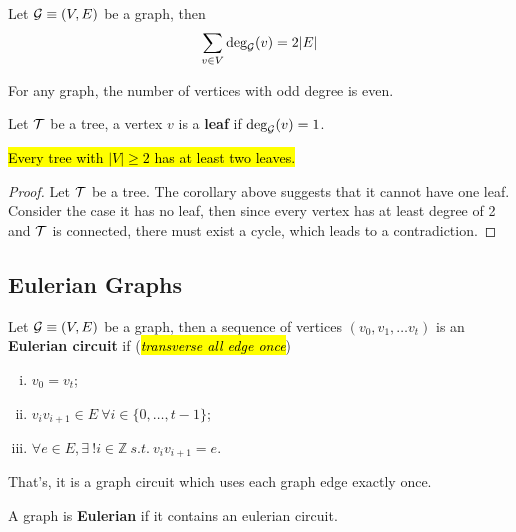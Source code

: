 \documentclass{article}
\def\Z{{\mathbb Z}}
\begin{document}
		\begin{theorem}
			Let $\mathcal{{G}} \equiv (V, E)$ be a graph, then
			\begin{equation}
				\sum_{v \in V}\text{{deg}}_{\mathcal{{G}}}(v) = 2 |E|
			\end{equation}
		\end{theorem}
		
		\begin{corollary}
			For any graph, the number of vertices with odd degree is even.
		\end{corollary}
		
		\begin{definition}
			Let $\mathcal{{T}}$ be a tree, a vertex $v$ is a \textbf{leaf} if $\text{{deg}}_{\mathcal{{G}}}(v)=1$.
		\end{definition}
		
		\begin{theorem}
			\hl{Every tree with $|V| \geq 2$ has at least two leaves.}
			\begin{proof}
				Let $\mathcal{{T}}$ be a tree. The corollary above suggests that it cannot have one leaf. Consider the case it has no leaf, then since every vertex has at least degree of 2 and $\mathcal{{T}}$ is connected, there must exist a cycle, which leads to a contradiction.
			\end{proof}
		\end{theorem}
		
		\subsection{Eulerian Graphs}
			\begin{definition}
				Let $\mathcal{{G}} \equiv (V, E)$ be a graph, then a sequence of vertices $(v_0,v_1,\dots v_t)$ is an \textbf{Eulerian circuit} if (\hl{\emph{transverse all edge once}})
				\begin{enumerate}[(i)]
					\item $v_0 = v_t$;
					\item $v_i v_{i+1} \in E\ \forall i \in \{0, \dots, t-1\}$;
					\item $\forall e \in E, \exists\ ! i \in \Z\ s.t.\ v_i v_{i+1} = e$.
				\end{enumerate}
				That's, it is a graph circuit which uses each graph edge exactly once.
			\end{definition}
			
			\begin{definition}
				A graph is \textbf{Eulerian} if it contains an eulerian circuit.
			\end{definition}
\end{document}
